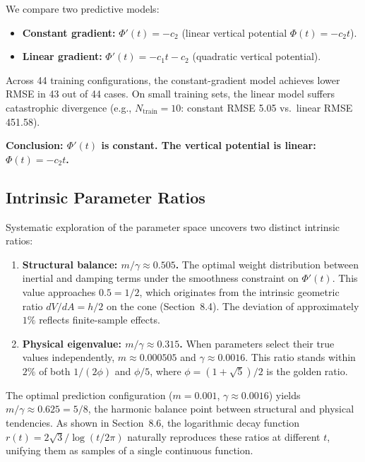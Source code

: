 \documentclass[12pt,a4paper]{article}
\begin{document}
We compare two predictive models:
\begin{itemize}
\item \textbf{Constant gradient:} $\Phi'(t) = -c_2$ (linear vertical potential $\Phi(t) = -c_2 t$).
\item \textbf{Linear gradient:} $\Phi'(t) = -c_1 t - c_2$ (quadratic vertical potential).
\end{itemize}

Across 44 training configurations, the constant-gradient model achieves lower RMSE in 43 out of 44 cases. On small training sets, the linear model suffers catastrophic divergence (e.g., $N_{\text{train}}=10$: constant RMSE 5.05 vs.\ linear RMSE 451.58).

\textbf{Conclusion: $\Phi'(t)$ is constant. The vertical potential is linear: $\Phi(t) = -c_2 t$.}

\subsection{Intrinsic Parameter Ratios}

Systematic exploration of the parameter space uncovers two distinct intrinsic ratios:

\begin{enumerate}
\item \textbf{Structural balance: $m/\gamma \approx 0.505$.} The optimal weight distribution between inertial and damping terms under the smoothness constraint on $\Phi'(t)$. This value approaches $0.5 = 1/2$, which originates from the intrinsic geometric ratio $dV/dA = h/2$ on the cone (Section~8.4). The deviation of approximately $1\%$ reflects finite-sample effects.

\item \textbf{Physical eigenvalue: $m/\gamma \approx 0.315$.} When parameters select their true values independently, $m \approx 0.000505$ and $\gamma \approx 0.0016$. This ratio stands within $2\%$ of both $1/(2\phi)$ and $\phi/5$, where $\phi = (1+\sqrt{5})/2$ is the golden ratio.
\end{enumerate}

The optimal prediction configuration ($m = 0.001$, $\gamma \approx 0.0016$) yields $m/\gamma \approx 0.625 = 5/8$, the harmonic balance point between structural and physical tendencies. As shown in Section~8.6, the logarithmic decay function $r(t) = 2\sqrt{3}/\log(t/2\pi)$ naturally reproduces these ratios at different $t$, unifying them as samples of a single continuous function.
\end{document}
